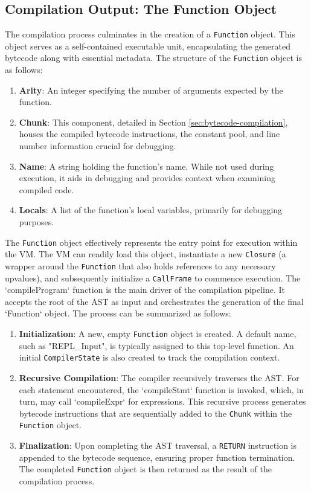 \subsection{Compilation Output: The Function Object}
\label{subsec:compilation-output}
The compilation process culminates in the creation of a \texttt{Function} object. This object serves as a self-contained executable unit, encapsulating the generated bytecode along with essential metadata. The structure of the \texttt{Function} object is as follows:
\begin{enumerate}
    \item \textbf{Arity}: An integer specifying the number of arguments expected by the function.
    \item \textbf{Chunk}: This component, detailed in Section \ref{sec:bytecode-compilation}, houses the compiled bytecode instructions, the constant pool, and line number information crucial for debugging.
    \item \textbf{Name}: A string holding the function's name. While not used during execution, it aids in debugging and provides context when examining compiled code.
    \item \textbf{Locals}: A list of the function's local variables, primarily for debugging purposes.
\end{enumerate}
The \texttt{Function} object effectively represents the entry point for execution within the VM. The VM can readily load this object, instantiate a new \texttt{Closure} (a wrapper around the \texttt{Function} that also holds references to any necessary upvalues), and subsequently initialize a \texttt{CallFrame} to commence execution.
The `compileProgram` function is the main driver of the compilation pipeline. It accepts the root of the AST as input and orchestrates the generation of the final `Function` object. The process can be summarized as follows:
\begin{enumerate}
    \item \textbf{Initialization}: A new, empty \texttt{Function} object is created. A default name, such as "REPL\_Input", is typically assigned to this top-level function. An initial \texttt{CompilerState} is also created to track the compilation context.
    \item \textbf{Recursive Compilation}: The compiler recursively traverses the AST. For each statement encountered, the `compileStmt` function is invoked, which, in turn, may call `compileExpr` for expressions. This recursive process generates bytecode instructions that are sequentially added to the \texttt{Chunk} within the \texttt{Function} object.
    \item \textbf{Finalization}: Upon completing the AST traversal, a \texttt{RETURN} instruction is appended to the bytecode sequence, ensuring proper function termination. The completed \texttt{Function} object is then returned as the result of the compilation process.
\end{enumerate}
